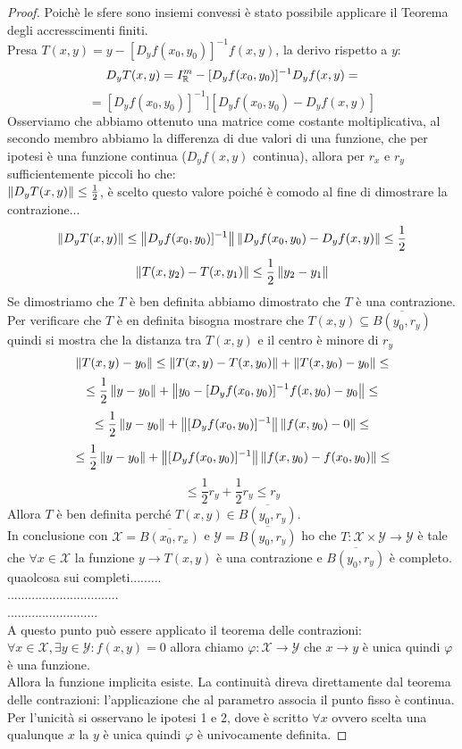 \begin{proof}
	Poichè le sfere sono insiemi convessi è stato possibile applicare il Teorema degli accresscimenti finiti.\\
	Presa $T(x,y) = y-[D_yf(x_0,y_0)]^{-1}f(x,y)$, la derivo rispetto a $y$:
	$$D_yT(x,y)= I_{\mathbb{R}}^m-[D_yf(x_0,y_0)]^{-1}D_yf(x,y) = $$
	$$=[D_yf(x_0,y_0)]^{-1}][D_yf(x_0,y_0)-D_yf(x,y)]$$
	Osserviamo che abbiamo ottenuto una matrice come costante moltiplicativa, al secondo membro abbiamo la differenza di due valori di una funzione, che per ipotesi è una funzione continua ($D_yf(x,y)$ continua), allora per $r_x$ e $r_y$ sufficientemente piccoli ho che:\\
	$\left\|D_yT(x,y)\right\| \le \frac{1}{2}$, è scelto questo valore poiché è comodo al fine di dimostrare la contrazione...\\
	$$\left\|D_yT(x,y)\right\| \le \left\|D_yf(x_0,y_0)]^{-1}\right\| \left\|D_yf(x_0,y_0)-D_yf(x,y)\right\|\le\frac{1}{2} $$  
	$$\left\|T(x,y_2)-T(x,y_1)\right\|\le\frac{1}{2}\left\|y_2-y_1\right\| $$
	Se dimostriamo che $T$ è ben definita abbiamo dimostrato che $T$ è una contrazione.\\
	Per verificare che $T$ è en definita bisogna mostrare che $T(x,y)\subseteq\overline{B(y_0,r_y)}$ quindi si mostra che la distanza tra $T(x,y)$ e il centro è minore di $r_y$
	$$\left\|T(x,y) - y_0\right\|\le\left\|T(x,y)-T(x,y_0)\right\|+\left\|T(x,y_0)-y_0\right\| \le$$
	$$\le\frac{1}{2}\left\|y-y_0\right\|+\left\|y_0-[D_yf(x_0,y_0)]^{-1}f(x,y_0)-y_0\right\|\le$$
	$$\le\frac{1}{2}\left\|y-y_0\right\|+\left\|[D_yf(x_0,y_0)]^{-1}\right\| \left\|f(x,y_0)-0\right\|\le$$
	$$\le\frac{1}{2}\left\|y-y_0\right\|+\left\|[D_yf(x_0,y_0)]^{-1}\right\| \left\|f(x,y_0)-f(x_0,y_0)\right\|\le$$
	$$\le\frac{1}{2}r_y+\frac{1}{2}r_y\le r_y$$
	Allora $T$ è ben definita perché $T(x,y)\in\overline{B(y_0,r_y)}$.\\
	In conclusione con $\mathcal{X}=\overline{B(x_0,r_x)}$ e $\mathcal{Y}=\overline{B(y_0,r_y)}$ ho che $T:\mathcal{X}\times\mathcal{Y}\rightarrow\mathcal{Y}$ è tale che $\forall x\in\mathcal{X}$ la funzione $y\rightarrow T(x,y)$ è una contrazione e $\overline{B(y_0,r_y)}$ è completo.\\
	quaolcosa sui completi.........\\
	................................\\
	..........................\\
	A questo punto può essere applicato il teorema delle contrazioni:\\
	$\forall x \in \mathcal{X}, \exists y \in\mathcal{Y}: f(x,y)=0$ allora chiamo $\varphi:\mathcal{X}\rightarrow\mathcal{Y}$ che $x\rightarrow y$ è unica quindi $\varphi$ è una funzione.\\
	Allora la funzione implicita esiste. La continuità direva direttamente dal teorema delle contrazioni: l'applicazione che al parametro associa il punto fisso è continua.\\
	Per l'unicità si osservano le ipotesi 1 e 2, dove è scritto $\forall x$ ovvero scelta una qualunque $x$ la $y$ è unica quindi $\varphi$ è univocamente definita.
	  
\end{proof}
